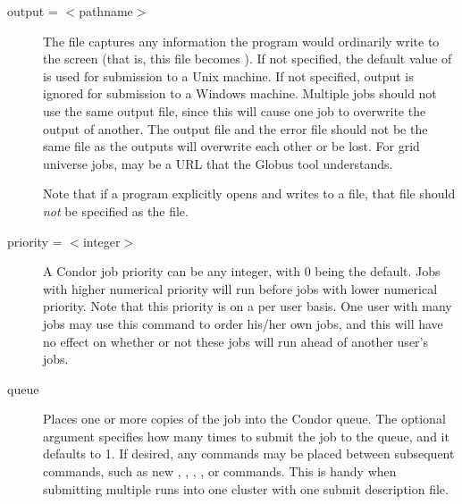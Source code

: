 \begin{description}
\item[output = $<$pathname$>$]
\label{man-condor-submit-output}
The  file captures
any information the program would ordinarily write to the screen
(that is, this file becomes ).
If not specified, the default value of
 is used for submission to a Unix machine.
If not specified, output is ignored
for submission to a Windows machine.
Multiple jobs should not use the same output
file, since this will cause one job to overwrite the output of
another.
The output file and the error file should not be the same file
as the outputs will overwrite each other or be lost.
For grid universe jobs,  may be a URL that the Globus
tool  understands.

Note that if a program explicitly opens and writes to a file,
that file should \emph{not} be specified as the  file.


\item[priority = $<$integer$>$] 
\label{man-condor-submit-priority}
A Condor job priority 
can be any integer, with 0 being the default.
Jobs with higher numerical priority will
run before jobs with lower numerical priority. Note that this priority
is on a per user basis.
One user with many jobs may use this command
to order his/her own jobs,
and this will have no effect on whether or
not these jobs will run ahead of another user's jobs.


\item[queue \oOptnm{number-of-procs}] Places one or more
\label{man-condor-submit-queue}
copies of the job into the Condor queue.
The optional
argument  specifies how many times to submit the
job to the queue, and it defaults to 1.
If desired, any commands may be placed
between subsequent  commands, such as new ,
, , ,
or  commands.
This is handy when submitting multiple runs into one cluster with
one submit description file.


\end{description}
